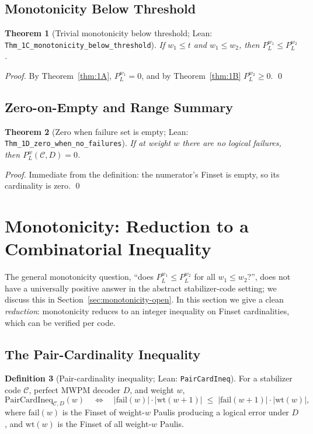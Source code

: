 \documentclass[11pt]{article}
\newtheorem{theorem}{Theorem}[section]
\theoremstyle{definition}
\newtheorem{definition}[theorem]{Definition}
\theoremstyle{remark}
\begin{document}
\subsection{Monotonicity Below Threshold}

\begin{theorem}[Trivial monotonicity below threshold; Lean: \texttt{Thm\_1C\_monotonicity\_below\_threshold}]
\label{thm:1C-triv}
If $w_1 \leq t$ and $w_1 \leq w_2$, then $P_L^{w_1} \leq P_L^{w_2}$.
\end{theorem}

\begin{proof}
By Theorem~\ref{thm:1A}, $P_L^{w_1} = 0$, and by Theorem~\ref{thm:1B}
$P_L^{w_2} \geq 0$.
\qed
\end{proof}

\subsection{Zero-on-Empty and Range Summary}

\begin{theorem}[Zero when failure set is empty; Lean: \texttt{Thm\_1D\_zero\_when\_no\_failures}]
\label{thm:1D}
If at weight $w$ there are no logical failures, then
$P_L^w(\mathcal{C}, D) = 0$.
\end{theorem}
\begin{proof}
Immediate from the definition: the numerator's Finset is empty, so
its cardinality is zero.
\qed
\end{proof}

\section{Monotonicity: Reduction to a Combinatorial Inequality}
\label{sec:monotonicity}

The general monotonicity question, ``does
$P_L^{w_1} \leq P_L^{w_2}$ for all $w_1 \leq w_2$?'', does not have a
universally positive answer in the abstract stabilizer-code setting;
we discuss this in Section~\ref{sec:monotonicity-open}.  In this
section we give a clean \emph{reduction}: monotonicity reduces
to an integer inequality on Finset cardinalities, which can be
verified per code.

\subsection{The Pair-Cardinality Inequality}

\begin{definition}[Pair-cardinality inequality; Lean: \texttt{PairCardIneq}]
\label{def:pair-card}
For a stabilizer code $\mathcal{C}$, perfect MWPM decoder $D$, and
weight $w$,
$$\mathrm{PairCardIneq}_{\mathcal{C}, D}(w) \quad\Longleftrightarrow\quad
|\mathrm{fail}(w)| \cdot |\mathrm{wt}(w+1)|
\;\leq\;
|\mathrm{fail}(w+1)| \cdot |\mathrm{wt}(w)|,$$
where $\mathrm{fail}(w)$ is the Finset of weight-$w$ Paulis
producing a logical error under $D$, and $\mathrm{wt}(w)$ is the
Finset of all weight-$w$ Paulis.
\end{definition}
\end{document}
